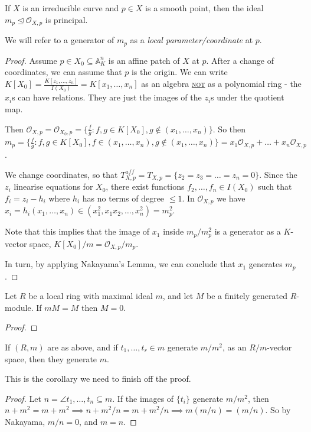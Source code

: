 \documentclass[10pt,a4paper,rgb]{article}
\newcommand{\A}{\mathbb{A}}
\begin{document}
\begin{theorem}
If $X$ is an irreducible curve and $p \in X$ is a smooth point, then the ideal $m_p \trianglelefteq \mathcal{O}_{X,p}$ is principal.
\end{theorem}
We will refer to a generator of $m_p$ as a \emph{local parameter/coordinate} at $p$.
\begin{proof}
Assume $p \in X_0 \subseteq \A_K^n$ is an affine patch of $X$ at $p$. After a change of coordinates, we can assume that $p$ is the origin. We can write $K[X_0] = \frac{K[z_1, \ldots, z_n]}{I(X_0)} = K[x_1, \ldots, x_n]$ as an algebra \underline{\textsc{not}} as a polynomial ring - the $x_i$s can have relations. They are just the images of the $z_i$s under the quotient map.

Then $\mathcal{O}_{X,p} = \mathcal{O}_{X_0,p} = \{\frac{f}{g} : f,g \in K[X_0], g \notin (x_1, \ldots, x_n)\}$. So then $m_p = \{\frac{f}{g} : f,g \in K[X_0], f \in (x_1, \ldots, x_n), g \notin (x_1, \ldots , x_n)\} = x_1\mathcal{O}_{X,p} + \ldots + x_n\mathcal{O}_{X,p}$.

We change coordinates, so that $T_{X,p}^{aff} = T_{X,p} = \{z_2 = z_3 = \ldots = z_n = 0\}$. Since the $z_i$ linearise equations for $X_0$, there exist functions $f_2, \ldots, f_n \in I(X_0)$ such that $f_i = z_i - h_i$ where $h_i$ has no terms of degree $\leq 1$. In $\mathcal{O}_{X,p}$ we have $x_i = h_i(x_1, \ldots, x_n) \in (x_1^2, x_1x_2, \ldots, x_n^2) = m_p^2$.

Note that this implies that the image of $x_1$ inside $m_p/{m_p^2}$ is a generator as a $K$-vector space, $K[X_0]/m = \mathcal{O}_{X,p}/{m_p}$.

In turn, by applying Nakayama's Lemma, we can conclude that $x_1$ generates $m_p$.
\end{proof}
\begin{lemma}
Let $R$ be a local ring with maximal ideal $m$, and let $M$ be a finitely generated $R$-module. If $mM = M$ then $M = 0$.
\end{lemma}
\begin{proof}
\google
\end{proof}
\begin{corollary}
If $(R,m)$ are as above, and if $t_1, \ldots, t_r \in m$ generate $m/m^2$, as an $R/{m}$-vector space, then they generate $m$.
\end{corollary}
This is the corollary we need to finish off the proof.
\begin{proof}
Let $n = \angle{t_1, \ldots, t_n} \subseteq m$. If the images of $\{t_i\}$ generate $m/{m^2}$, then $n+m^2 = m+m^2 \implies n+m^2/n = m+m^2/n \implies m(m/n) = (m/n)$. So by Nakayama, $m/n = 0$, and $m = n$.
\end{proof}
\end{document}
